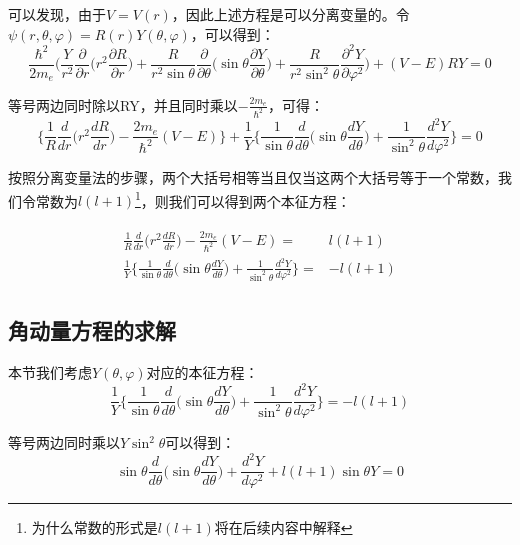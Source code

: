         可以发现，由于$V=V(r)$，因此上述方程是可以分离变量的。令$\psi(r,\theta,\varphi)=R(r)Y(\theta,\varphi)$，可以得到：
        \begin{equation}
            \frac{\hbar^2}{2m_e}\Big(\frac{Y}{r^2}\frac{\partial }{\partial r}\Big(r^2\frac{\partial R}{\partial  r}\Big)+\frac{R}{r^2\sin{\theta}}\frac{\partial }{\partial \theta}\Big(\sin{\theta}\frac{\partial Y}{\partial \theta}\Big)+\frac{R}{r^2\sin^2{\theta}}\frac{\partial^2 Y}{\partial\varphi^2}\Big)+(V-E)RY=0
        \end{equation}
        
        等号两边同时除以RY，并且同时乘以$-\frac{2m_e}{\hbar^2}$，可得：
        \begin{equation}
            \Big\{\frac{1}{R}\frac{d}{dr}\Big(r^2\frac{dR}{dr}\Big)-\frac{2m_e}{\hbar^2}(V-E)\Big\}+\frac{1}{Y}\Big\{\frac{1}{\sin{\theta}}\frac{d}{d\theta}\Big(\sin{\theta}\frac{dY}{d\theta}\Big)+\frac{1}{\sin^2{\theta}}\frac{d^2Y}{d\varphi^2}\Big\}=0
        \end{equation}
        
        按照分离变量法的步骤，两个大括号相等当且仅当这两个大括号等于一个常数，我们令常数为$l(l+1)$\footnote{为什么常数的形式是$l(l+1)$将在后续内容中解释}，则我们可以得到两个本征方程：
        
        \begin{align}
            \begin{split}
                \frac{1}{R}\frac{d}{dr}\Big(r^2\frac{dR}{dr}\Big)-\frac{2m_e}{\hbar^2}(V-E)=&l(l+1)\\
                \frac{1}{Y}\Big\{\frac{1}{\sin{\theta}}\frac{d}{d\theta}\Big(\sin{\theta}\frac{dY}{d\theta}\Big)+\frac{1}{\sin^2{\theta}}\frac{d^2Y}{d\varphi^2}\Big\}=&-l(l+1)
            \end{split}
        \end{align}
        \subsection{角动量方程的求解}
            本节我们考虑$Y(\theta,\varphi)$对应的本征方程：
            \begin{equation}
                \frac{1}{Y}\Big\{\frac{1}{\sin{\theta}}\frac{d}{d\theta}\Big(\sin{\theta}\frac{dY}{d\theta}\Big)+\frac{1}{\sin^2{\theta}}\frac{d^2Y}{d\varphi^2}\Big\}=-l(l+1)
            \end{equation}

            等号两边同时乘以$Y\sin^2{\theta}$可以得到：
            \begin{equation}
                \sin{\theta}\frac{d}{d\theta}\Big(\sin{\theta}\frac{dY}{d\theta}\Big)+\frac{d^2Y}{d\varphi^2}+l(l+1)\sin{\theta}Y=0
            \end{equation}
            
